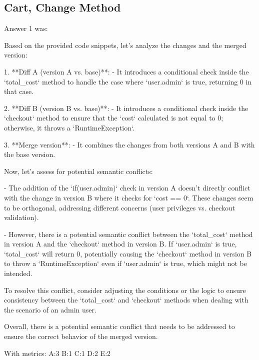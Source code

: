 \subsection{Cart, Change Method}

Answer 1 was:
\begin{spverbatim}
Based on the provided code snippets, let's analyze the changes and the merged version:

1. **Diff A (version A vs. base)**:
   - It introduces a conditional check inside the `total_cost` method to handle the case where `user.admin` is true, returning 0 in that case.

2. **Diff B (version B vs. base)**:
   - It introduces a conditional check inside the `checkout` method to ensure that the `cost` calculated is not equal to 0; otherwise, it throws a `RuntimeException`.

3. **Merge version**:
   - It combines the changes from both versions A and B with the base version.

Now, let's assess for potential semantic conflicts:

- The addition of the `if(user.admin)` check in version A doesn't directly conflict with the change in version B where it checks for `cost == 0`. These changes seem to be orthogonal, addressing different concerns (user privileges vs. checkout validation).
  
- However, there is a potential semantic conflict between the `total_cost` method in version A and the `checkout` method in version B. If `user.admin` is true, `total_cost` will return 0, potentially causing the `checkout` method in version B to throw a `RuntimeException` even if `user.admin` is true, which might not be intended.

To resolve this conflict, consider adjusting the conditions or the logic to ensure consistency between the `total_cost` and `checkout` methods when dealing with the scenario of an admin user.

Overall, there is a potential semantic conflict that needs to be addressed to ensure the correct behavior of the merged version.
\end{spverbatim}

With metrics:
A:3
B:1
C:1
D:2
E:2

